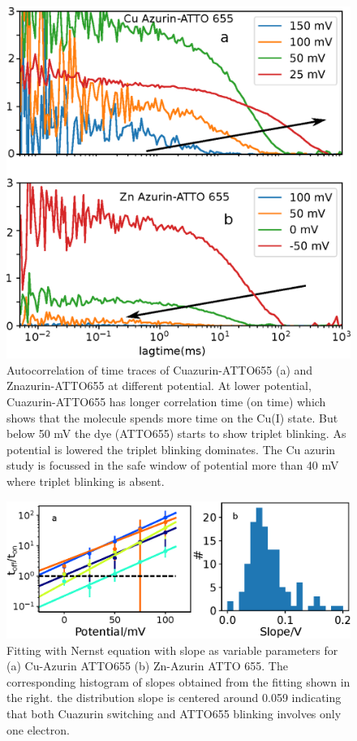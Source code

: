 \documentclass[11pt,a4paper,onecolumn]{article}
\begin{document}
\begin{figure}
  \centering
  \includegraphics[width=\textwidth,keepaspectratio]{fcs_comparision.eps}
  \makeatletter
  \renewcommand{\fnum@figure}{\figurename~S\thefigure}
  \makeatother
  \caption{Autocorrelation of time traces of Cuazurin-ATTO655 (a) and Znazurin-ATTO655 at different potential. At lower potential, Cuazurin-ATTO655 has longer correlation time (on time) which shows that the molecule spends more time on the Cu(I) state. But below 50 mV the dye (ATTO655) starts to show triplet blinking. As potential is lowered the triplet blinking dominates. The Cu azurin study is focussed in the safe window of potential more than 40 mV where triplet blinking is absent.}
  \label{SIfig:fcscomparision}
\end{figure}
\begin{figure}
  \centering
  \includegraphics[width=\textwidth,keepaspectratio]{SI_potential_slope.eps}
	\makeatletter
	\renewcommand{\fnum@figure}{\figurename~S\thefigure}
	\makeatother
  \caption{Fitting with Nernst equation with slope as variable parameters for  (a) Cu-Azurin ATTO655 (b) Zn-Azurin ATTO 655. The corresponding histogram of slopes obtained from the fitting shown in the right. the distribution slope is centered around 0.059 indicating that both Cuazurin switching and ATTO655 blinking involves only one electron.}
  \label{SIfig:potential_slope}
\end{figure}
\end{document}
